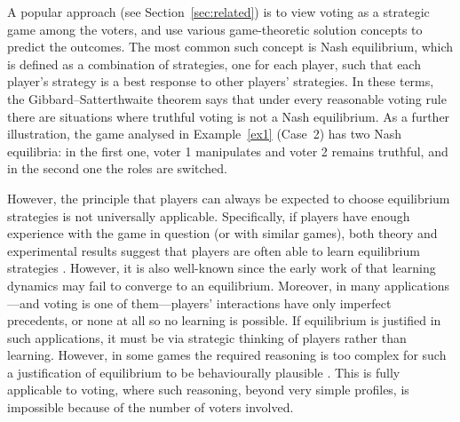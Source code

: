 \documentclass[11pt]{article}
\begin{document}
A popular approach (see Section~\ref{sec:related}) is to view voting as a strategic game among the voters, 
and use various game-theoretic solution concepts to predict the outcomes. 
The most common such concept is Nash equilibrium, which 
is defined as a combination of strategies, one for each player, 
such that each player's strategy is a best response to other players' strategies. 
In these terms, the Gibbard--Satterthwaite theorem says that under every reasonable voting rule 
there are situations where truthful voting is not a Nash equilibrium.
As a further illustration, the game analysed in Example~\ref{ex1} (Case~2) has two Nash equilibria:
in the first one, voter 1 manipulates and voter 2 remains truthful, and in the second one the roles
are switched. 

However, the principle that players can always be expected to choose equilibrium strategies is 
not universally applicable. Specifically, if players have enough experience 
with the game in question  (or with similar games), both theory and experimental 
results suggest that players are often able to learn equilibrium strategies \citep{fudenberg1998theory}. However, it is 
also well-known since the early work of \cite{shapley64} that learning dynamics may fail to converge to an equilibrium.
Moreover, in many applications---and voting is one of them---players' interactions have only imperfect precedents, 
or none at all so no learning is possible. If equilibrium is justified in such applications, it must be via 
strategic thinking of players rather than learning. However, in some games the required reasoning is too complex for 
such a justification of equilibrium to be behaviourally plausible 
\citep{harsanyi1988general,brandenburger1992knowledge}. This is fully applicable to voting, where such reasoning, 
beyond very simple profiles, is impossible because of the number of voters involved.
\end{document}
